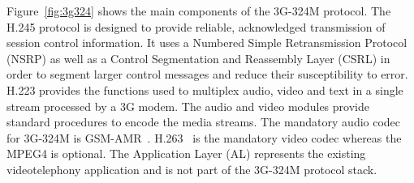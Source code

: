 \documentclass[10pt, conference, compsocconf]{IEEEtran}
\begin{document}

Figure~\ref{fig:3g324} shows the main components of the 3G-324M protocol. The H.245 protocol is designed to provide reliable, acknowledged transmission of session control information. It uses a Numbered Simple Retransmission Protocol (NSRP) as well as a Control Segmentation and Reassembly Layer (CSRL) in order to segment larger control messages and reduce their susceptibility to error. H.223 provides the functions used to multiplex audio, video and text in a single stream processed by a 3G modem. The audio and video modules provide standard procedures to encode the media streams. The mandatory audio codec for 3G-324M is GSM-AMR~\cite{amr}. H.263~\cite{h.263} is the mandatory video codec whereas the MPEG4 is optional. The Application Layer (AL) represents the existing videotelephony application and is not part of the 3G-324M protocol stack.




\end{document}
